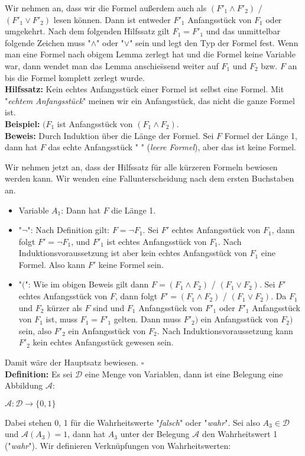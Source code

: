 \documentclass{scrartcl}
\begin{document}
Wir nehmen an, dass wir die Formel au{\ss}erdem auch als  $(F'_1 \wedge F'_2)$ / $(F'_1 \vee F'_2)$ lesen k\"onnen. Dann ist entweder $F'_1$ Anfangsst\"uck von $F_1$ oder umgekehrt. Nach dem folgenden Hilfssatz gilt $F_1 = F'_1$ und das unmittelbar folgende Zeichen muss "$\wedge$" oder "$\vee$" sein und legt den Typ der Formel fest. Wenn man eine Formel nach obigem Lemma zerlegt hat und die Formel keine Variable war, dann wendet man das Lemma anschie{\"ss}end weiter auf $F_1$ und $F_2$ bzw. $F$ an bis die Formel komplett zerlegt wurde.\\
\textbf{Hilfssatz:} Kein echtes Anfangsst\"uck einer Formel ist selbst eine Formel. Mit "\textit{echtem Anfangsst\"uck}" meinen wir ein Anfangsst\"uck, das nicht die ganze Formel ist.\\
\textbf{Beispiel:} $(F_1$ ist Anfangsst\"uck von $(F_1 \wedge F_2)$.\\
\textbf{Beweis:} Durch Induktion \"uber die L\"ange der Formel. Sei $F$ Formel der L\"ange 1, dann hat $F$ das echte Anfangsst\"uck " " (\textit{leere Formel}), aber das ist keine Formel.\\ 

\newpage

Wir nehmen jetzt an, dass der Hilfssatz f\"ur alle k\"urzeren Formeln bewiesen werden kann. Wir wenden eine Fallunterscheidung nach dem ersten Buchstaben an.
\begin{itemize}
\item Variable $A_1$: Dann hat $F$ die L\"ange 1.
\item "$\neg$": Nach Definition gilt: $F = \neg F_1$. Sei $F'$ echtes Anfangsst\"uck von $F_1$, dann folgt $F' = \neg F_1$, und $F'_1$ ist echtes Anfangsst\"uck von $F_1$. Nach Induktionsvoraussetzung ist aber kein echtes Anfangsst\"uck von $F_1$ eine Formel. Also kann $F'$ keine Formel sein.
\item "$($": Wie im obigen Beweis gilt dann $F = (F_1 \wedge F_2)$ / $(F_1 \vee F_2)$. Sei $F'$ echtes Anfangsst\"uck von $F$, dann folgt $F' = (F_1 \wedge F_2)$ / $(F_1 \vee F_2)$. Da $F_1$ und $F_2$ k\"urzer als $F$ sind und $F_1$ Anfangsst\"uck von $F'_1$ oder $F'_1$ Anfangsst\"uck von $F_1$ ist, muss $F_1 = F'_1$ gelten. Dann muss $F'_2)$ ein Anfangsst\"uck von $F_2)$ sein, also $F'_2$ ein Anfangsst\"uck von $F_2$. Nach Induktionsvoraussetzung kann $F'_2$ kein echtes Anfangsst\"uck gewesen sein.
\end{itemize}
Damit w\"are der Hauptsatz bewiesen. $\square$\\
\textbf{Definition:} Es sei $\mathcal{D}$ eine Menge von Variablen, dann ist eine Belegung eine Abbildung $\mathcal{A}$:
\begin{center}
$\mathcal{A}: \mathcal{D} \rightarrow \{0, 1\}$
\end{center}
Dabei stehen 0, 1 f\"ur die Wahrheitswerte "\textit{falsch}" oder "\textit{wahr}". Sei also $A_3 \in \mathcal{D}$ und $\mathcal{A}(A_3) = 1$, dann hat $A_3$ unter der Belegung $\mathcal{A}$ den Wahrheitswert 1 ("\textit{wahr}"). Wir definieren Verkn\"upfungen von Wahrheitswerten:
\end{document}
